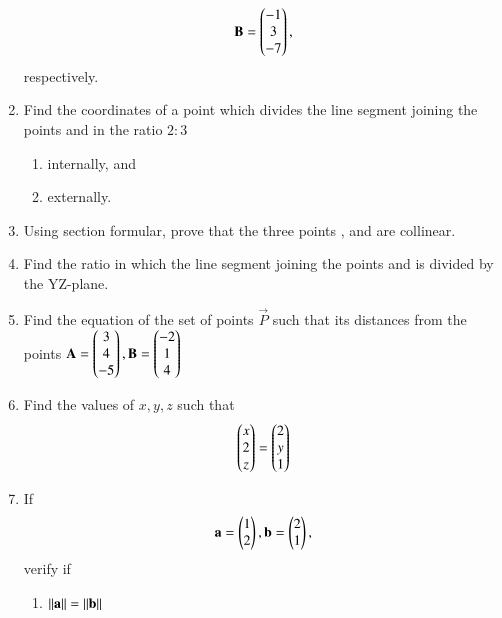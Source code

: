 \begin{enumerate}[label=\arabic*.,ref=\thesubsection.\theenumi]
\begin{align}
\mathbf{B} = \begin{pmatrix}-1\\3 \\-7\end{pmatrix},
\end{align}
%
respectively.
%
\item Find the coordinates of a point which divides the line segment joining the points  and  in the ratio $2:3$
\begin{enumerate}
\item internally, and
\item externally.
\end{enumerate}
%
\item Using section formular, prove that the three points ,  and  are collinear.
%
\item Find the ratio in which the line segment joining the points  and  is divided by the YZ-plane.
%
\item Find the equation of the set of points $\vec{P}$ such that its distances from the points
$
\mathbf{A}=\begin{pmatrix}3\\4\\-5\end{pmatrix}, 
\mathbf{B}=\begin{pmatrix}-2\\1\\4\end{pmatrix}
$ 
%
\item Find the values of $x, y, z$ such that 
\begin{align}
\begin{pmatrix}x\\2\\z\end{pmatrix}= \begin{pmatrix}2\\y\\1\end{pmatrix}
\end{align}
%
\item If
\begin{align}
\mathbf{a} = \begin{pmatrix}1\\2\end{pmatrix}, \mathbf{b} = \begin{pmatrix}2\\1\end{pmatrix},
\end{align}
verify if  
\begin{enumerate}
\item $\left\lVert\mathbf{a}\right\rVert=\left\lVert\mathbf{b}\right\rVert$


\end{enumerate}
\end{enumerate}
